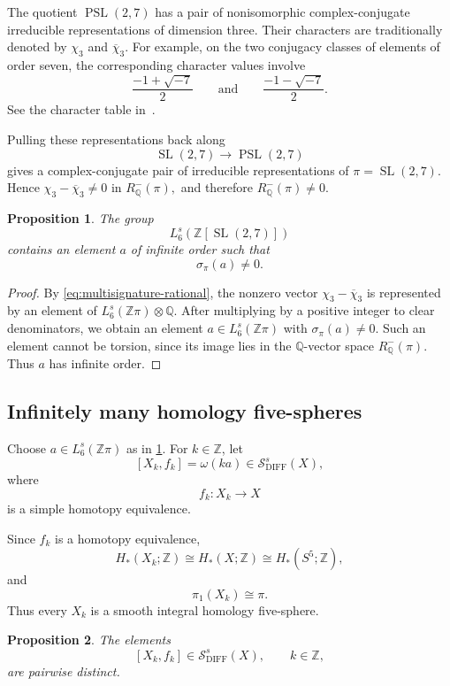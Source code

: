 \documentclass[10pt,reqno]{amsart}
\numberwithin{equation}{section}
\newtheorem{proposition}{Proposition}
\theoremstyle{definition}
\theoremstyle{remark}
\newcommand{\Z}{\mathbb Z}
\newcommand{\Q}{\mathbb Q}
\newcommand{\DIFF}{\mathrm{DIFF}}
\newcommand{\cS}{\mathcal S}
\newcommand{\SL}{\operatorname{SL}}
\newcommand{\PSL}{\operatorname{PSL}}
\begin{document}
The quotient $\PSL(2,7)$
has a pair of nonisomorphic complex-conjugate irreducible
representations of dimension three.  Their characters are
traditionally denoted by $\chi_3$ and $\overline{\chi}_3.$
For example, on the two conjugacy classes of elements of order seven,
the corresponding character values involve
\[
\frac{-1+\sqrt{-7}}{2}
\qquad\text{and}\qquad
\frac{-1-\sqrt{-7}}{2}.
\]
See the character table in~\cite{Atlas}.

Pulling these representations back along
\[
\SL(2,7)\longrightarrow\PSL(2,7)
\]
gives a complex-conjugate pair of irreducible representations of
\(\pi=\SL(2,7)\).  Hence $\chi_3-\overline{\chi}_3\neq0$ in $R^-_{\Q}(\pi),$
and therefore \(R^-_{\Q}(\pi)\neq0\).

\begin{proposition}\label{prop:L6-infinite}
The group
\[
L_6^s(\Z[\SL(2,7)])
\]
contains an element \(a\) of infinite order such that
\[
\sigma_\pi(a)\neq0.
\]
\end{proposition}

\begin{proof}
By \eqref{eq:multisignature-rational}, the nonzero vector
\(\chi_3-\overline{\chi}_3\) is represented by an element of
\(L_6^s(\Z\pi)\otimes\Q\).  After multiplying by a positive integer to
clear denominators, we obtain an element
\(a\in L_6^s(\Z\pi)\) with \(\sigma_\pi(a)\neq0\).  Such an element
cannot be torsion, since its image lies in the \(\Q\)-vector space
\(R^-_{\Q}(\pi)\).  Thus \(a\) has infinite order.
\end{proof}

\subsection{Infinitely many homology five-spheres}

Choose \(a\in L_6^s(\Z\pi)\) as in
\cref{prop:L6-infinite}.  For \(k\in\Z\), let
\[
[X_k,f_k]
=
\omega(ka)
\in
\cS^s_{\DIFF}(X),
\]
where
\[
f_k\colon X_k\longrightarrow X
\]
is a simple homotopy equivalence.

Since \(f_k\) is a homotopy equivalence,
\[
H_*(X_k;\Z)\cong H_*(X;\Z)\cong H_*(S^5;\Z),
\]
and
\[
\pi_1(X_k)\cong \pi.
\]
Thus every \(X_k\) is a smooth integral homology five-sphere.

\begin{proposition}\label{prop:distinct-marked}
The elements
\[
[X_k,f_k]\in\cS^s_{\DIFF}(X),
\qquad k\in\Z,
\]
are pairwise distinct.
\end{proposition}
\end{document}
